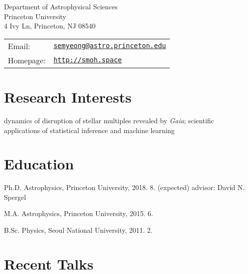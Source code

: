 \documentclass[11pt,letterpaper]{article}
\renewenvironment{itemize}{
  \begin{list}{}{
    \setlength{\leftmargin}{1.5em}
  }
}{
  \end{list}
}
\def\name{Semyeong Oh}
\begin{document}

\begin{minipage}{0.45\linewidth}
 Department of Astrophysical Sciences \\
 Princeton University \\
 4 Ivy Ln, Princeton, NJ 08540
\end{minipage}
\begin{minipage}{0.45\linewidth}
 \begin{tabular}{ll}
   Email: & \href{mailto:semyeong@astro.princeton.edu}{\tt semyeong@astro.princeton.edu}\\
   Homepage: & \href{http://smoh.space}{\tt http://smoh.space} \\
 \end{tabular}
\end{minipage}


\section*{Research Interests}

dynamics of disruption of stellar multiples revealed by {\it Gaia};
scientific applications of statistical inference and machine learning

\section*{Education}

\begin{itemize}
  \setlength\itemsep{0.2em}
  \item Ph.D. Astrophysics, Princeton University, 2018. 8. (expected)
    advisor: David N. Spergel

  \item M.A. Astrophysics, Princeton University, 2015. 6.


  \item B.Sc. Physics, Seoul National University, 2011. 2.
\end{itemize}

\section*{Recent Talks}
\end{document}
